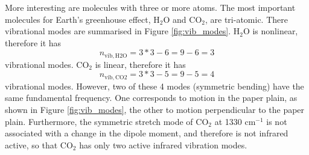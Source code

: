 More interesting are molecules with three or more atoms. The most
important molecules for Earth's greenhouse effect, 
H$_2$O and CO$_2$, are tri-atomic. There vibrational modes are
summarised in Figure \ref{fig:vib_modes}. H$_2$O is nonlinear, therefore it has
\begin{equation}
  n_\mathrm{vib,H2O} = 3*3-6 = 9-6 = 3
\end{equation}
vibrational modes. CO$_2$ is linear, therefore it has
\begin{equation}
  n_\mathrm{vib,CO2} = 3*3-5 = 9-5 = 4
\end{equation}
vibrational modes. However, two of these 4 modes (symmetric bending)
have the same fundamental frequency. One corresponds to motion in the
paper plain, as shown in Figure \ref{fig:vib_modes}, the other to
motion perpendicular to the paper plain. Furthermore, the symmetric
stretch mode of CO$_2$ at 1330 cm$^{-1}$ is not associated with a
change in the dipole moment, and therefore is not infrared active, so
that CO$_2$ has only two active infrared vibration modes.

